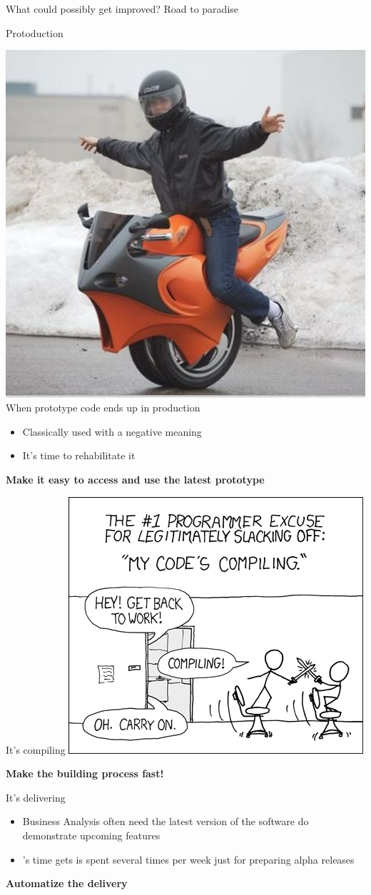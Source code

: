 \documentclass[presentation]{beamer}
\begin{document}
\begin{frame}{What could possibly get improved? Road to paradise}
	\begin{block}{Protoduction \cite{jargon}}
		\begin{center}
			\includegraphics[width=.25\textwidth]{images/protoduction} \\
			When prototype code ends up in production
		\end{center}
		\begin{itemize}
			\item Classically used with a negative meaning
			\item It's time to rehabilitate it
		\end{itemize}
		\textbf{Make it easy to access and use the latest prototype}
	\end{block}
	\begin{block}{It's compiling \cite{xkcd303}}
		\centering
		\includegraphics[width=.49\textwidth]{images/compiling}

		\textbf{Make the building process fast!}
	\end{block}
	\begin{block}{It's delivering}
		\begin{itemize}
			\item Business Analysis often need the latest version of the software do demonstrate upcoming features
			\item \baddev{}'s time gets is spent several times per week just for preparing alpha releases
		\end{itemize}
		\textbf{Automatize the delivery}
	\end{block}
\end{frame}
\end{document}
